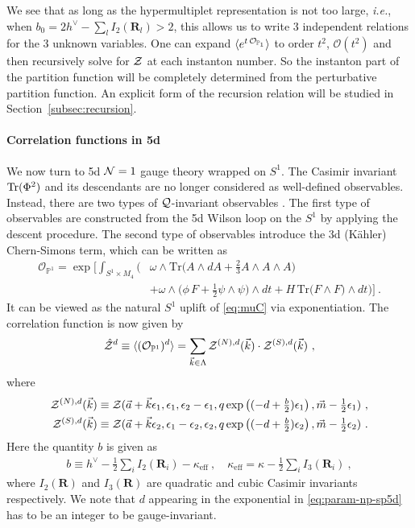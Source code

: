 \documentclass[letterpaper, 11pt]{article}
\def\IP{\mathbb{P}}
\def\CN{{\cal N}}
\def\CO{{\cal O}}
\def\CQ{{\cal Q}}
\def\CZ{{\cal Z}}
\def\e{\epsilon}
\def\half{\frac{1}{2}}
\def\Tr{{\rm Tr}}
\begin{document}
We see that as long as the hypermultiplet representation is not too large, \emph{i.e.}, when $b_0 = 2h^\vee - \sum_l I_2(\mathbf{R}_l) > 2$, this allows us to write 3 independent relations for the 3 unknown variables. One can expand $\langle e^{t \, \CO_{\IP_1}}\rangle$ to order $t^2$, $\mathcal{O}(t^2)$ and then recursively solve for $\CZ$ at each instanton number. So the instanton part of the partition function will be completely determined from the perturbative partition function. An explicit form of the recursion relation will be studied in Section~\ref{subsec:recursion}.

\paragraph{Correlation functions in 5d}
We now turn to 5d $\CN=1$ gauge theory wrapped on $S^1$. The Casimir invariant $\Tr (\Phi^2)$ and its descendants are no longer considered as well-defined observables. Instead, there are two types of $\CQ$-invariant observables \cite{Baulieu:1997nj}. The first type of observables are constructed from the 5d Wilson loop on the $S^1$ by applying the descent procedure. The second type of observables introduce the 3d (K\"ahler) Chern-Simons term, which can be written as \cite{Losev:1995cr,Baulieu:1997nj}
\begin{align} 
  \mathcal{O}_{\IP^1} = \exp\bigg[
    \int_{S^1 \times M_4} \bigg( & \omega \wedge \text{Tr}\Big(A \wedge dA + \frac{2}{3}A\wedge A \wedge A \Big) \\ \nonumber
     & + \omega \wedge \Big( \phi \, F + \frac{1}{2}\psi \wedge \psi \Big)\wedge dt + H\, \text{Tr}\Big( F \wedge F \Big) \wedge dt \bigg)
     \bigg] \ .
\end{align}
It can be viewed as the natural $S^1$ uplift of \eqref{eq:muC} via exponentiation. The correlation function is now given by
\begin{align}
  \label{eq:cor5d}
  \hat{\CZ}^{d} \equiv \langle (\mathcal{O}_{\IP^1})^{d}\rangle = \sum_{\vec{k} \in \Lambda}  \CZ^{(N),d}(\vec{k}) \cdot \CZ^{(S),d}(\vec{k}) \ , 
\end{align} 
where
\begin{align}
  \label{eq:param-np-sp5d}
\begin{split}
  \CZ^{(N),d}(\vec{k}) &\equiv \CZ(\vec{a}+\vec{k} \e_1, \e_1, \e_2-\e_1, q \exp \left((-d + \tfrac{b}{2})\e_1 \right), \vec{m} -\tfrac{1}{2}\e_1) \ , \\
  \CZ^{(S),d}(\vec{k}) &\equiv \CZ(\vec{a}+\vec{k} \e_2, \e_1 - \e_2, \e_2, q \exp \left( (-d + \tfrac{b}{2})\e_2\right), \vec{m} -\tfrac{1}{2}\e_2)\ . 
\end{split}
\end{align}
Here the quantity $b$ is given as 
\begin{align}
 b \equiv h^\vee - \frac{1}{2} \sum_i I_2(\mathbf{R}_i) - \kappa_{\textrm{eff}} \ , \quad \kappa_{\textrm{eff}} = \kappa - \half \sum_i I_3(\mathbf{R}_i) \ , 
\end{align}
where $I_2(\mathbf{R})$ and $I_3(\mathbf{R})$ are quadratic and cubic Casimir invariants respectively. 
We note that $d$ appearing in the exponential in \eqref{eq:param-np-sp5d} has to be an integer to be gauge-invariant.
\end{document}
